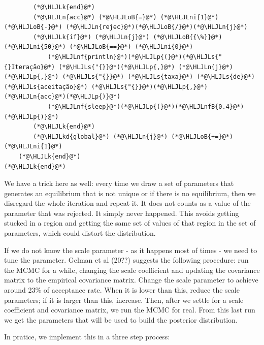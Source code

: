 \documentclass[12pt,a4paper]{article}
\newcommand{\HLJLk}[1]{\textcolor[RGB]{148,91,176}{\textbf{#1}}}
\newcommand{\HLJLkd}[1]{\textcolor[RGB]{214,102,97}{\textit{#1}}}
\newcommand{\HLJLn}[1]{#1}
\newcommand{\HLJLnf}[1]{\textcolor[RGB]{66,102,213}{#1}}
\newcommand{\HLJLs}[1]{\textcolor[RGB]{201,61,57}{#1}}
\newcommand{\HLJLnfB}[1]{\textcolor[RGB]{59,151,46}{#1}}
\newcommand{\HLJLni}[1]{\textcolor[RGB]{59,151,46}{#1}}
\newcommand{\HLJLoB}[1]{\textcolor[RGB]{102,102,102}{\textbf{#1}}}
\newcommand{\HLJLp}[1]{#1}
\begin{document}
\begin{lstlisting}
        (*@\HLJLk{end}@*)
        (*@\HLJLn{acc}@*) (*@\HLJLoB{=}@*) (*@\HLJLni{1}@*) (*@\HLJLoB{-}@*) (*@\HLJLn{rejec}@*)(*@\HLJLoB{/}@*)(*@\HLJLn{j}@*)
        (*@\HLJLk{if}@*) (*@\HLJLn{j}@*) (*@\HLJLoB{{\%}}@*) (*@\HLJLni{50}@*) (*@\HLJLoB{==}@*) (*@\HLJLni{0}@*)
            (*@\HLJLnf{println}@*)(*@\HLJLp{(}@*)(*@\HLJLs{"{}Iteração}@*) (*@\HLJLs{"{}}@*)(*@\HLJLp{,}@*) (*@\HLJLn{j}@*)(*@\HLJLp{,}@*) (*@\HLJLs{"{}}@*) (*@\HLJLs{taxa}@*) (*@\HLJLs{de}@*) (*@\HLJLs{aceitação}@*) (*@\HLJLs{"{}}@*)(*@\HLJLp{,}@*) (*@\HLJLn{acc}@*)(*@\HLJLp{)}@*)
            (*@\HLJLnf{sleep}@*)(*@\HLJLp{(}@*)(*@\HLJLnfB{0.4}@*)(*@\HLJLp{)}@*)
        (*@\HLJLk{end}@*)
        (*@\HLJLkd{global}@*) (*@\HLJLn{j}@*) (*@\HLJLoB{+=}@*) (*@\HLJLni{1}@*)
    (*@\HLJLk{end}@*)
(*@\HLJLk{end}@*)
\end{lstlisting}

We have a trick here as well: every time we draw a set of parameters that generates an equilibrium that is not unique or if there is no equilibrium, then we disregard the whole iteration and repeat it. It does not counts as a value of the parameter that was rejected. It simply never happened. This avoids getting stucked in a region and getting the same set of values of that region in the set of parameters, which could distort the distribution.

If we do not know the scale parameter - as it happens most of times - we need to tune the parameter. Gelman et al (20??) suggests the following procedure: run the MCMC for a while, changing the scale coefficient and updating the covariance matrix to the empirical covariance matrix. Change the scale parameter to achieve around 23\% of acceptance rate. When it is lower than this, reduce the scale parameters; if it is larger than this, increase. Then, after we settle for a scale coefficient and covariance matrix, we run the MCMC for real. From this last run we get the parameters that will be used to build the posterior distribution.

In pratice, we implement this in a three step process:
\end{document}
